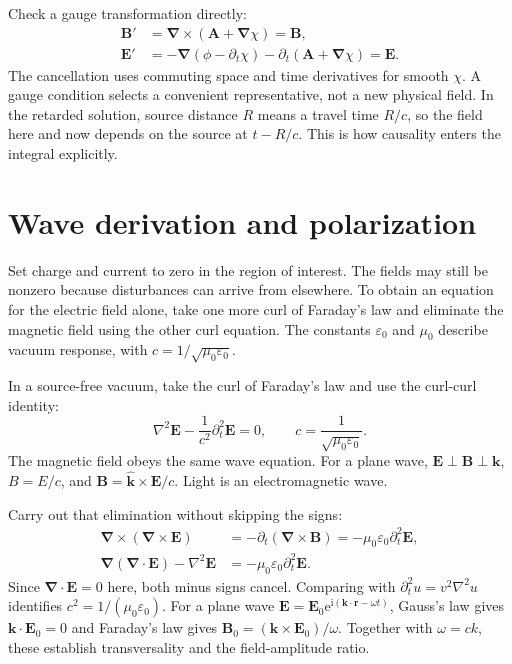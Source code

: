 \documentclass[11pt,oneside]{book}
\newcommand{\ii}{\mathrm{i}}
\newcommand{\ee}{\mathrm{e}}
\newcommand{\vect}[1]{\boldsymbol{#1}}
\newcommand{\grad}{\boldsymbol{\nabla}}
\newcommand{\lap}{\nabla^2}
\newcommand{\eps}{\varepsilon_0}
\newcommand{\mun}{\mu_0}
\theoremstyle{reviewstyle}
\begin{document}
Check a gauge transformation directly:
\begin{align}
\vect B'&=\grad\times(\vect A+\grad\chi)=\vect B,\\
\vect E'&=-\grad(\phi-\partial_t\chi)-\partial_t(\vect A+\grad\chi)
=\vect E.
\end{align}
The cancellation uses commuting space and time derivatives for smooth $\chi$. A gauge condition selects a convenient representative, not a new physical field. In the retarded solution, source distance $R$ means a travel time $R/c$, so the field here and now depends on the source at $t-R/c$. This is how causality enters the integral explicitly.

\section{Wave derivation and polarization}
Set charge and current to zero in the region of interest. The fields may still be nonzero because disturbances can arrive from elsewhere. To obtain an equation for the electric field alone, take one more curl of Faraday's law and eliminate the magnetic field using the other curl equation. The constants $\eps$ and $\mun$ describe vacuum response, with $c=1/\sqrt{\mun\eps}$.

In a source-free vacuum, take the curl of Faraday's law and use the curl-curl identity:
\begin{equation}\lap\vect E-\frac1{c^2}\partial_t^2\vect E=0,\qquad c=\frac1{\sqrt{\mun\eps}}.\end{equation}
The magnetic field obeys the same wave equation. For a plane wave, $\vect E\perp\vect B\perp\vect k$, $B=E/c$, and
$\vect B=\hat{\vect k}\times\vect E/c$. Light is an electromagnetic wave.

Carry out that elimination without skipping the signs:
\begin{align}
\grad\times(\grad\times\vect E)
&=-\partial_t(\grad\times\vect B)
=-\mun\eps\partial_t^2\vect E,\\
\grad(\grad\cdot\vect E)-\lap\vect E
&=-\mun\eps\partial_t^2\vect E.
\end{align}
Since $\grad\cdot\vect E=0$ here, both minus signs cancel. Comparing with $\partial_t^2u=v^2\lap u$ identifies $c^2=1/(\mun\eps)$. For a plane wave $\vect E=\vect E_0\ee^{\ii(\vect k\cdot\vect r-\omega t)}$, Gauss's law gives $\vect k\cdot\vect E_0=0$ and Faraday's law gives $\vect B_0=(\vect k\times\vect E_0)/\omega$. Together with $\omega=ck$, these establish transversality and the field-amplitude ratio.
\end{document}

